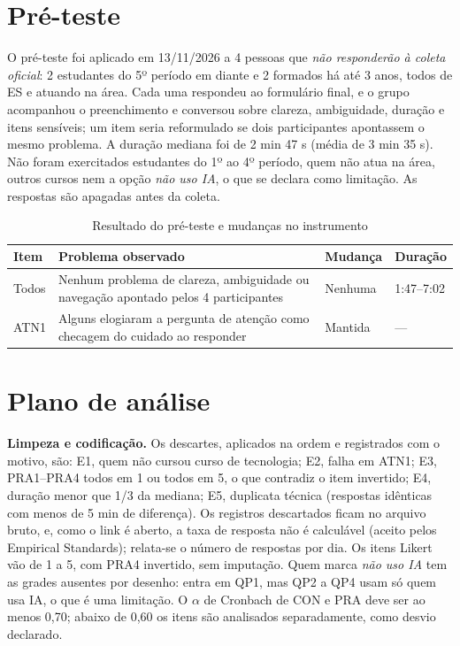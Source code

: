 \documentclass[12pt,a4paper]{article}
\newcommand{\fonte}[1]{\par\vspace{1pt}{\footnotesize\singlespacing Fonte: #1}\par\vspace{4pt}}
\newcommand{\thead}[1]{\textbf{#1}}
\newcommand{\quadro}{\begin{table}[H]\centering\footnotesize\singlespacing}
\newcommand{\fimquadro}{\end{table}}
\begin{document}
\section{Pré-teste}

O pré-teste foi aplicado em 13/11/2026 a 4 pessoas que \emph{não responderão à coleta oficial}: 2 estudantes do 5º período em diante e 2 formados há até 3 anos, todos de ES e atuando na área. Cada uma respondeu ao formulário final, e o grupo acompanhou o preenchimento e conversou sobre clareza, ambiguidade, duração e itens sensíveis; um item seria reformulado se dois participantes apontassem o mesmo problema. A duração mediana foi de 2 min 47 s (média de 3 min 35 s). Não foram exercitados estudantes do 1º ao 4º período, quem não atua na área, outros cursos nem a opção \emph{não uso IA}, o que se declara como limitação. As respostas são apagadas antes da coleta.

\quadro
\caption{Resultado do pré-teste e mudanças no instrumento}\label{tab:pre}
\begin{tabularx}{\textwidth}{@{}L{1.5cm}YL{3.3cm}L{1.9cm}@{}}
\toprule
\thead{Item} & \thead{Problema observado} & \thead{Mudança} & \thead{Duração} \\
\midrule
Todos & Nenhum problema de clareza, ambiguidade ou navegação apontado pelos 4 participantes & Nenhuma & 1:47–7:02 \\
ATN1 & Alguns elogiaram a pergunta de atenção como checagem do cuidado ao responder & Mantida & --- \\
\bottomrule
\end{tabularx}
\fonte{Dados do pré-teste, Microsoft Forms (13 nov. 2026).}
\fimquadro

\section{Plano de análise}

\textbf{Limpeza e codificação.} Os descartes, aplicados na ordem e registrados com o motivo, são: E1, quem não cursou curso de tecnologia; E2, falha em ATN1; E3, PRA1–PRA4 todos em 1 ou todos em 5, o que contradiz o item invertido; E4, duração menor que 1/3 da mediana; E5, duplicata técnica (respostas idênticas com menos de 5 min de diferença). Os registros descartados ficam no arquivo bruto, e, como o link é aberto, a taxa de resposta não é calculável (aceito pelos Empirical Standards); relata-se o número de respostas por dia. Os itens Likert vão de 1 a 5, com PRA4 invertido, sem imputação. Quem marca \emph{não uso IA} tem as grades ausentes por desenho: entra em QP1, mas QP2 a QP4 usam só quem usa IA, o que é uma limitação. O $\alpha$ de Cronbach de CON e PRA deve ser ao menos 0,70; abaixo de 0,60 os itens são analisados separadamente, como desvio declarado.
\end{document}
